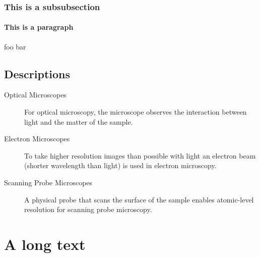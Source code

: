       \subsubsection{This is a subsubsection}

        \paragraph{This is a paragraph} foo bar

    \subsection{Descriptions}
      \begin{description}
        \item[Optical Microscopes]
          For optical microscopy, the microscope observes the interaction between light and the matter of the sample.
        \item[Electron Microscopes]
          To take higher resolution images than possible with light an electron beam (shorter wavelength than light) is used in electron microscopy.
        \item[Scanning Probe Microscopes]
          A physical probe that scans the surface of the sample enables atomic-level resolution for scanning probe microscopy.
      \end{description}


  \section{A long text}

    \lipsum[3-56]
